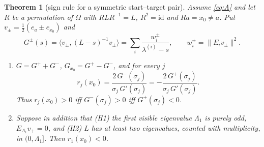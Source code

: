 \documentclass[11pt,a4paper]{article}
\newcommand{\ip}[2]{\langle #1,#2\rangle}
\theoremstyle{plain}
\newtheorem{theorem}{Theorem}[section]
\theoremstyle{definition}
\numberwithin{equation}{section}
\begin{document}
\begin{theorem}[sign rule for a symmetric start--target pair]\label{thm:r1}
Assume \eqref{eq:A} and let $R$ be a permutation of $\Omega$ with $RLR^{-1}=L$, $R^2=\mathrm{id}$ and $Ra=x_0\neq a$. Put $v_\pm=\frac12(e_a\pm e_{x_0})$ and
\[
G^{\pm}(s)=\ip{v_\pm}{(L-s)^{-1}v_\pm}=\sum_{i}\frac{w_i^{\pm}}{\lambda^{(i)}-s},\qquad w_i^\pm=\|E_iv_\pm\|^2 .
\]
\begin{enumerate}
\item[(a)] $G=G^++G^-$, $G_{x_0}=G^+-G^-$, and for every $j$
\begin{equation}\label{eq:rsign}
r_j(x_0)=\frac{2\,G^-(\sigma_j)}{\sigma_j\,G'(\sigma_j)}=-\frac{2\,G^+(\sigma_j)}{\sigma_j\,G'(\sigma_j)} .
\end{equation}
Thus $r_j(x_0)>0$ iff $G^-(\sigma_j)>0$ iff $G^+(\sigma_j)<0$.
\item[(b)] Suppose in addition that (H1) the first visible eigenvalue $\Lambda_1$ is \emph{purely odd}, $E_{\Lambda_1}v_+=0$, and (H2) $L$ has at least two eigenvalues, counted with multiplicity, in $(0,\Lambda_1]$. Then $r_1(x_0)<0$.
\end{enumerate}
\end{theorem}
\end{document}
